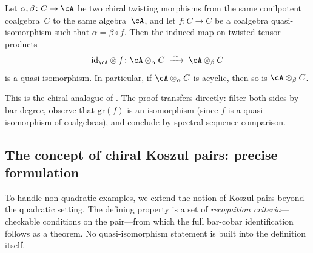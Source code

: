 \begin{theorem}
\label{thm:chiral-comparison-lemma}
Let $\alpha, \beta \colon C \to \cA$ be two chiral twisting morphisms
from the same conilpotent coalgebra~$C$ to the same algebra~$\cA$,
and let $f \colon C \to C$ be a coalgebra quasi-isomorphism such that
$\alpha = \beta \circ f$.  Then the induced map on twisted tensor
products
\[
\mathrm{id}_\cA \otimes f \colon
\cA \otimes_\alpha C \;\xrightarrow{\;\sim\;}\; \cA \otimes_\beta C
\]
is a quasi-isomorphism.  In particular, if
$\cA \otimes_\alpha C$ is acyclic, then so is
$\cA \otimes_\beta C$.

This is the chiral analogue of \textup{\cite[Theorem~2.4.1]{LV12}}.
The proof transfers directly: filter both sides by bar degree, observe
that $\mathrm{gr}(f)$ is an isomorphism (since $f$ is a quasi-isomorphism
of coalgebras), and conclude by spectral sequence comparison.
\end{theorem}

\subsection{The concept of chiral Koszul pairs: precise formulation}

To handle non-quadratic examples, we extend the notion of Koszul pairs
beyond the quadratic setting.  The defining property is a set of
\emph{recognition criteria}---checkable conditions on the pair---from
which the full bar-cobar identification follows as a theorem.
No quasi-isomorphism statement is built into the definition itself.

